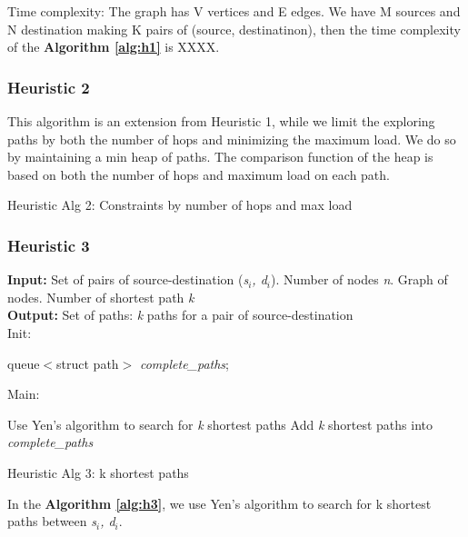 Time complexity: The graph has V vertices and E edges. We have M sources and N destination making K pairs of (source, destinatinon), then the time complexity of the \textbf{Algorithm \ref{alg:h1}} is XXXX.

\subsubsection{Heuristic 2}
This algorithm is an extension from Heuristic 1, while we limit the exploring paths by both the number of hops and minimizing the maximum load. We do so by maintaining a min heap of paths. The comparison function of the heap is based on both the number of hops and maximum load on each path.

\begin{algorithm}

\caption{Heuristic Alg 2: Constraints by number of hops and max load}
\label{alg:h2}
\end{algorithm}

\subsubsection{Heuristic 3}

\begin{algorithm}
\textbf{Input:} Set of pairs of source-destination (\textit{s$_i$, d$_i$}). Number of nodes \textit{n}. Graph of nodes. Number of shortest path \textit{k}\\
\textbf{Output:} Set of paths: \textit{k} paths for a pair of source-destination\\
Init:
    \begin{algorithmic}
        \State queue$<$struct path$>$ \textit{complete\_paths};
    \end{algorithmic}
Main:
\begin{algorithmic}
	    \State Use Yen's algorithm to search for \textit{k} shortest paths
	    \State Add \textit{k} shortest paths into \textit{complete\_paths}
	\EndFor
    \EndFunction
\end{algorithmic}

\caption{Heuristic Alg 3: k shortest paths}
\label{alg:h3}

\end{algorithm}

In the \textbf{Algorithm \ref{alg:h3}}, we use Yen's algorithm to search for k shortest paths between \textit{s$_i$, d$_i$}.

